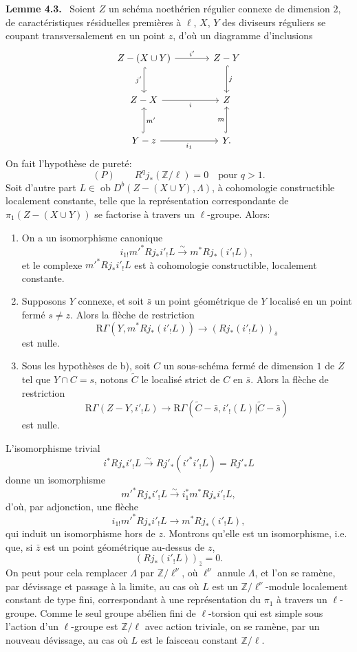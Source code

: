 \documentclass[11pt]{article}
\newenvironment{statement}[1]{\par\medskip\noindent\textbf{#1.}\ }{\par\medskip}
\providecommand{\Ob}{\operatorname{ob}}
\providecommand{\Ob}{\operatorname{ob}}
\providecommand{\Ob}{\operatorname{Ob}}
\providecommand{\Ob}{\operatorname{ob}}
\providecommand{\Ob}{\operatorname{Ob}}
\begin{document}
\begin{statement}{Lemme 4.3}
Soient $Z$ un schéma noethérien régulier connexe de dimension $2$, de caractéristiques résiduelles premières à $\ell$, $X$, $Y$ des diviseurs réguliers se coupant transversalement en un point $z$, d'où un diagramme d'inclusions
\[
\begin{tikzcd}[column sep=large,row sep=large]
Z-(X\cup Y) \arrow[r,"i'"] \arrow[d,hook,"j'"'] & Z-Y \arrow[d,hook,"j"]\\
Z-X \arrow[r,"i"'] & Z\\
Y-z \arrow[r,"i_1"'] \arrow[u,hook,"m'"'] & Y \arrow[u,hook,"m"] .
\end{tikzcd}
\]
On fait l'hypothèse de pureté:
\[
(P)\qquad R^qj_*(\mathbb Z/\ell)=0\quad\text{pour }q>1.
\]
Soit d'autre part $L\in\Ob D^b(Z-(X\cup Y),\Lambda)$, à cohomologie constructible localement constante, telle que la représentation correspondante de $\pi_1(Z-(X\cup Y))$ se factorise à travers un $\ell$-groupe. Alors:
\begin{enumerate}[label=\alph*)]
\item On a un isomorphisme canonique
\[
i_{1!}m'^*Rj_*i'_!L\xrightarrow{\sim} m^*Rj_*(i'_!L),
\]
et le complexe $m'^*Rj_*i'_!L$ est à cohomologie constructible, localement constante.
\item Supposons $Y$ connexe, et soit $\bar s$ un point géométrique de $Y$ localisé en un point fermé $s\ne z$. Alors la flèche de restriction
\begin{equation}
\mathrm R\Gamma(Y,m^*Rj_*(i'_!L))\longrightarrow (Rj_*(i'_!L))_{\bar s}
\tag{4.3.1}
\end{equation}
est nulle.
\item Sous les hypothèses de b), soit $C$ un sous-schéma fermé de dimension $1$ de $Z$ tel que $Y\cap C=s$, notons $\widetilde C$ le localisé strict de $C$ en $\bar s$. Alors la flèche de restriction
\begin{equation}
\mathrm R\Gamma(Z-Y,i'_!L)
\longrightarrow
\mathrm R\Gamma(\widetilde C-\bar s,i'_!(L)|\widetilde C-\bar s)
\tag{4.3.2}
\end{equation}
est nulle.
\end{enumerate}
\end{statement}

L'isomorphisme trivial
\[
i^*Rj_*i'_!L\xrightarrow{\sim}Rj'_*(i'^*i'_!L)=Rj'_*L
\]
donne un isomorphisme
\[
m'^*Rj_*i'_!L\xrightarrow{\sim} i_1^*m^*Rj_*i'_!L,
\]
d'où, par adjonction, une flèche
\[
i_{1!}m'^*Rj_*i'_!L\longrightarrow m^*Rj_*(i'_!L),
\]
qui induit un isomorphisme hors de $z$. Montrons qu'elle est un isomorphisme, i.e. que, si $\bar z$ est un point géométrique au-dessus de $z$,
\[
(Rj_*(i'_!L))_{\bar z}=0.
\]
On peut pour cela remplacer $\Lambda$ par $\mathbb Z/\ell^\nu$, où $\ell^\nu$ annule $\Lambda$, et l'on se ramène, par dévissage et passage à la limite, au cas où $L$ est un $\mathbb Z/\ell^\nu$-module localement constant de type fini, correspondant à une représentation du $\pi_1$ à travers un $\ell$-groupe. Comme le seul groupe abélien fini de $\ell$-torsion qui est simple sous l'action d'un $\ell$-groupe est $\mathbb Z/\ell$ avec action triviale, on se ramène, par un nouveau dévissage, au cas où $L$ est le faisceau constant $\mathbb Z/\ell$.
\end{document}
